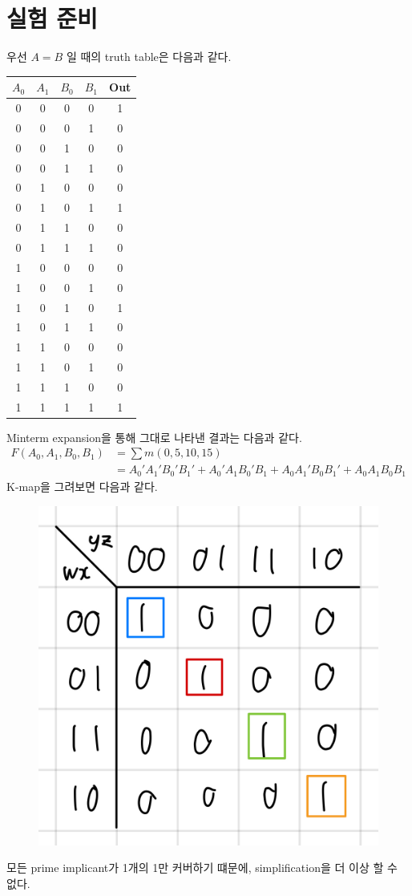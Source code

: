 \documentclass{scrartcl}
\begin{document}
\section{실험 준비}
우선 \(A = B\) 일 때의 truth table은 다음과 같다.
\begin{table}[H]
  \centering
  \begin{tabular}{|cccc|c|}
  \hline
  \(A_0\) & \(A_1\) & \(B_0\) & \(B_1\) & Out \\ \hline
  0       & 0       & 0       & 0       & 1   \\
  0       & 0       & 0       & 1       & 0   \\
  0       & 0       & 1       & 0       & 0   \\
  0       & 0       & 1       & 1       & 0   \\
  0       & 1       & 0       & 0       & 0   \\
  0       & 1       & 0       & 1       & 1   \\
  0       & 1       & 1       & 0       & 0   \\
  0       & 1       & 1       & 1       & 0   \\
  1       & 0       & 0       & 0       & 0   \\
  1       & 0       & 0       & 1       & 0   \\
  1       & 0       & 1       & 0       & 1   \\
  1       & 0       & 1       & 1       & 0   \\
  1       & 1       & 0       & 0       & 0   \\
  1       & 1       & 0       & 1       & 0   \\
  1       & 1       & 1       & 0       & 0   \\
  1       & 1       & 1       & 1       & 1   \\ \hline
  \end{tabular}
\end{table}

Minterm expansion을 통해 그대로 나타낸 결과는 다음과 같다.
\begin{align*}
  F(A_0, A_1, B_0, B_1) &= \sum m(0, 5, 10, 15) \\
                        &= A_0' A_1' B_0' B_1' + A_0' A_1 B_0' B_1 + A_0 A_1' B_0 B_1' + A_0 A_1 B_0 B_1
\end{align*}
K-map을 그려보면 다음과 같다.
\begin{figure}[H]
  \centering
  \includegraphics[width=0.4\linewidth]{EQ_KM}
\end{figure}
모든 prime implicant가 1개의 1만 커버하기 떄문에, simplification을 더 이상 할 수 없다.
\end{document}
